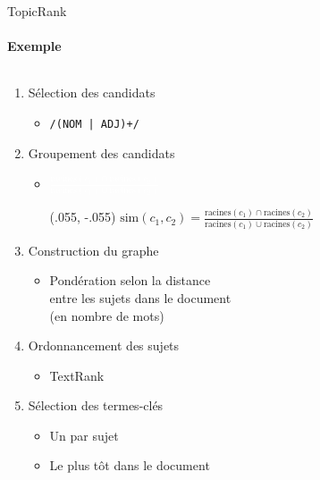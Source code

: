 \begin{frame}{TopicRank}\framesubtitle{Exemple}
  \begin{columns}
    \begin{column}{.45\linewidth}
      \begin{enumerate}\setlength{\itemindent}{-.75cm}
        \item<1->{Sélection des candidats}
          \begin{itemize}\setlength{\itemindent}{-1.1cm}
          \item{\texttt{/(NOM | ADJ)+/}}
        \end{itemize}
        \item<2->{Groupement des candidats}
        \begin{itemize}\setlength{\itemindent}{-1.1cm}
          \item{\textcolor{white}{$\frac{\text{racines}(c_1) \cap \text{racines}(c_2)}{\text{racines}(c_1) \cup \text{racines}(c_2)}$}}
          \begin{textblock*}{\textwidth}(.055\textwidth, -.055\textheight)
            $\text{sim}(c_1, c_2) = \frac{\text{racines}(c_1) \cap \text{racines}(c_2)}{\text{racines}(c_1) \cup \text{racines}(c_2)}$
          \end{textblock*}
        \end{itemize}
        \item<3->{Construction du graphe}
        \begin{itemize}\setlength{\itemindent}{-1.1cm}
          \item{
            Pondération selon la distance\\
            \hspace{-1.1cm}entre les sujets dans le document\\
            \hspace{-1.1cm}(en nombre de mots)}
        \end{itemize}
        \item<4->{Ordonnancement des sujets}
        \begin{itemize}\setlength{\itemindent}{-1.1cm}
          \item{TextRank}
        \end{itemize}
        \item<5->{Sélection des termes-clés}
        \begin{itemize}\setlength{\itemindent}{-1.1cm}
          \item{Un par sujet}
          \item{Le plus tôt dans le document}
        \end{itemize}
      \end{enumerate}
    \end{column}


\end{columns}
\end{frame}
